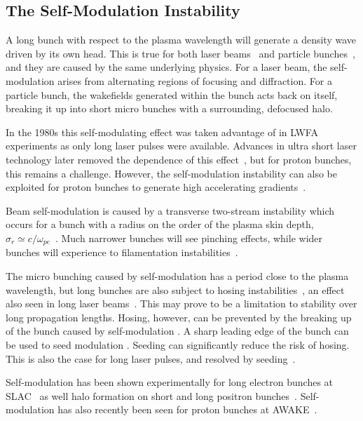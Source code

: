 \subsection{The Self-Modulation Instability}
\label{Int:DBeam:SMI}

A long bunch with respect to the plasma wavelength will generate a density wave driven by its own head.
This is true for both laser beams~\cite{esarey:1994} and particle bunches~\cite{kumar:2010}, and they are caused by the same underlying physics.
For a laser beam, the self-modulation arises from alternating regions of focusing and diffraction.
For a particle bunch, the wakefields generated within the bunch acts back on itself, breaking it up into short micro bunches with a surrounding, defocused halo.

In the 1980s this self-modulating effect was taken advantage of in LWFA experiments as only long laser pulses were available.
Advances in ultra short laser technology later removed the dependence of this effect~\cite{pukhov:2002}, but for proton bunches, this remains a challenge.
However, the self-modulation instability can also be exploited for proton bunches to generate high accelerating gradients~\cite{schroeder:2012,schroeder:2011,caldwell:2009}.

Beam self-modulation is caused by a transverse two-stream instability which occurs for a bunch with a radius on the order of the plasma skin depth, $\sigma_{r} \simeq c/\omega_{pe}$~\cite{vieira:2012}.
Much narrower bunches will see pinching effects, while wider bunches will experience to filamentation instabilities~\cite{keinigs:1987}.

The micro bunching caused by self-modulation has a period close to the plasma wavelength, but long bunches are also subject to hosing instabilities~\cite{whittum:1991}, an effect also seen in long laser beams~\cite{duda:1999,duda:2000}.
This may prove to be a limitation to stability over long propagation lengths.
Hosing, however, can be prevented by the breaking up of the bunch caused by self-modulation \cite{vieira:2014}.
A sharp leading edge of the bunch can be used to seed modulation \cite{fang:2014}.
Seeding can significantly reduce the risk of hosing.
This is also the case for long laser pulses, and resolved by seeding~\cite{vieira:2012}. 

Self-modulation has been shown experimentally for long electron bunches at SLAC~\cite{muggli:2014,muggli:2015} as well halo formation on short and long positron bunches~\cite{muggli:2008,hogan:2003}.
Self-modulation has also recently been seen for proton bunches at AWAKE~\cite{muggli:2017a}.

